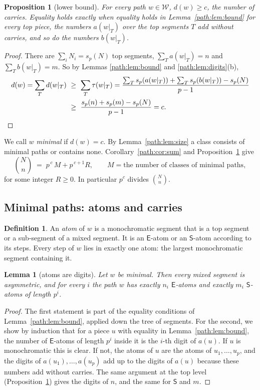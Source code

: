 \documentclass[11pt]{article}
\newtheorem{lemma}[theorem]{Lemma}
\newtheorem{proposition}[theorem]{Proposition}
\theoremstyle{definition}
\newtheorem{definition}[theorem]{Definition}
\theoremstyle{remark}
\numberwithin{equation}{section}
\numberwithin{figure}{section}
\newcommand{\E}{\textsf{E}}
\newcommand{\Ss}{\textsf{S}}
\newcommand{\W}{\mathcal{W}}
\begin{document}
\begin{proposition}[lower bound]\label{path:prop:bound}
For every path $w\in\W$, $d(w)\ge c$, the number of carries. Equality holds exactly when equality holds in
Lemma~\ref{path:lem:bound} for every top piece, the numbers $a(w|_T)$ over the top segments $T$ add without carries,
and so do the numbers $b(w|_T)$.
\end{proposition}
\begin{proof}
There are $\sum_iN_i=s_p(N)$ top segments, $\sum_Ta(w|_T)=n$ and $\sum_Tb(w|_T)=m$. So by
Lemmas \ref{path:lem:bound} and \ref{path:lem:digits}(b),
\begin{align*}
d(w)=\sum_T d(w|_T)\ &\ge\ \sum_T\tau(w|_T)=\frac{\sum_Ts_p(a(w|_T))+\sum_Ts_p(b(w|_T))-s_p(N)}{p-1}\\
&\ge\ \frac{s_p(n)+s_p(m)-s_p(N)}{p-1}=c. \qedhere
\end{align*}
\end{proof}

We call $w$ \emph{minimal} if $d(w)=c$. By Lemma~\ref{path:lem:size} a class consists of minimal paths or contains
none. Corollary~\ref{path:cor:sum} and Proposition~\ref{path:prop:bound} give
\begin{equation}\label{path:eq:modp}
\binom Nn\;=\;p^{\,c}\,M+p^{\,c+1}R,\qquad M=\text{the number of classes of minimal paths},
\end{equation}
for some integer $R\ge0$. In particular $p^c$ divides $\binom Nn$.

\subsection{Minimal paths: atoms and carries}\label{path:sec:minimal}

\begin{definition}
An \emph{atom} of $w$ is a monochromatic segment that is a top segment or a sub-segment of a mixed segment. It is an
$\E$-atom or an $\Ss$-atom according to its steps. Every step of $w$ lies in exactly one atom: the largest
monochromatic segment containing it.
\end{definition}

\begin{lemma}[atoms are digits]\label{path:lem:atoms}
Let $w$ be minimal. Then every mixed segment is asymmetric, and for every $i$ the path $w$ has exactly $n_i$
$\E$-atoms and exactly $m_i$ $\Ss$-atoms of length $p^i$.
\end{lemma}
\begin{proof}
The first statement is part of the equality conditions of Lemma~\ref{path:lem:bound}, applied down the tree of segments. For the second, we show by induction
that for a piece $u$ with equality in Lemma~\ref{path:lem:bound}, the number of $\E$-atoms of length $p^i$ inside it is the
$i$-th digit of $a(u)$. If $u$ is monochromatic this is clear. If not, the atoms of $u$ are the atoms of
$u_1,\dots,u_p$, and the digits of $a(u_1),\dots,a(u_p)$ add up to the digits of $a(u)$ because these numbers
add without carries. The same argument at the top level (Proposition~\ref{path:prop:bound}) gives the digits of $n$, and the
same for $\Ss$ and $m$.
\end{proof}
\end{document}
